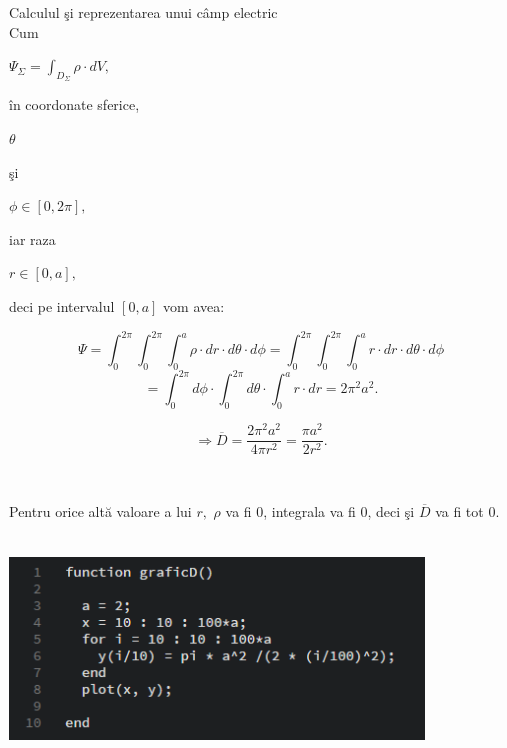 \documentclass[a4paper]{article}
\begin{document}
\begin{section}{Calculul \c si reprezentarea unui c\^ amp electric \\}
	Cum 	\begin{large} $ \Psi_\Sigma = \int_{D_\Sigma}{\rho \cdot dV}, $ \end{large} \^ in coordonate sferice, \begin{large} $ \theta $ \end{large} \c si \begin{large} $ \phi \in [0, 2\pi], $ \end{large} iar raza \begin{large} $ r \in [0, a], $ \end{large} deci pe intervalul $ [0, a] $ vom avea:
	\begin{large}
	$$ \Psi = \int_{0}^{2\pi}{ \int_{0}^{2\pi}{ \int_{0}^{a}{\rho \cdot dr \cdot d\theta \cdot d\phi}}} = \int_{0}^{2\pi}{ \int_{0}^{2\pi}{ \int_{0}^{a}{r \cdot dr \cdot d\theta \cdot d\phi}}} $$
	$$= \int_{0}^{2\pi}{d\phi} \cdot \int_{0}^{2\pi}{d\theta} \cdot \int_{0}^{a}{r \cdot dr} = 2 \pi^2 a^2. $$
	\end{large}
	\begin{large} $$ \Longrightarrow   \overline{D} = \frac{2 \pi^2 a^2}{4\pi r^2} = \frac{\pi a^2}{2r^2}. $$ \end{large}  \\ \par
	Pentru orice alt\u a valoare a lui $ r, $ $ \rho $ va fi 0, integrala va fi 0, deci \c si $ \overline{D} $ va fi tot 0. 
\pagebreak
\begin{center}
	\includegraphics[width=11cm, height=6cm]{graficD.png}

\end{center}
\end{section}
\end{document}
